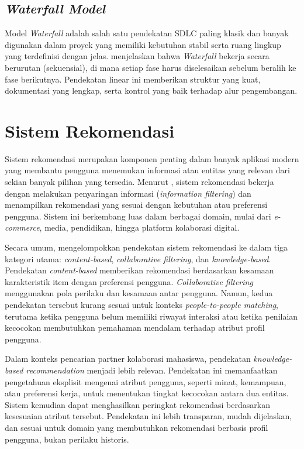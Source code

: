 \subsection{\textit{Waterfall Model}}
Model \textit{Waterfall} adalah salah satu pendekatan SDLC paling klasik dan banyak digunakan dalam proyek yang memiliki kebutuhan stabil serta ruang lingkup yang terdefinisi dengan jelas. \textcite{sommervilleSoftwareEngineering2016} menjelaskan bahwa \textit{Waterfall} bekerja secara berurutan (sekuensial), di mana setiap fase harus diselesaikan sebelum beralih ke fase berikutnya. Pendekatan linear ini memberikan struktur yang kuat, dokumentasi yang lengkap, serta kontrol yang baik terhadap alur pengembangan.

\section{Sistem Rekomendasi}
Sistem rekomendasi merupakan komponen penting dalam banyak aplikasi modern yang membantu pengguna menemukan informasi atau entitas yang relevan dari sekian banyak pilihan yang tersedia. Menurut \textcite{ricciIntroductionRecommenderSystems2011}, sistem rekomendasi bekerja dengan melakukan penyaringan informasi (\textit{information filtering}) dan menampilkan rekomendasi yang sesuai dengan kebutuhan atau preferensi pengguna. Sistem ini berkembang luas dalam berbagai domain, mulai dari \textit{e-commerce}, media, pendidikan, hingga platform kolaborasi digital.

Secara umum, \textcite{adomaviciusNextGenerationRecommender2005} mengelompokkan pendekatan sistem rekomendasi ke dalam tiga kategori utama: \textit{content-based}, \textit{collaborative filtering}, dan \textit{knowledge-based}. Pendekatan \textit{content-based} memberikan rekomendasi berdasarkan kesamaan karakteristik item dengan preferensi pengguna. \textit{Collaborative filtering} menggunakan pola perilaku dan kesamaan antar pengguna. Namun, kedua pendekatan tersebut kurang sesuai untuk konteks \textit{people-to-people matching}, terutama ketika pengguna belum memiliki riwayat interaksi atau ketika penilaian kecocokan membutuhkan pemahaman mendalam terhadap atribut profil pengguna.

Dalam konteks pencarian partner kolaborasi mahasiswa, pendekatan \textit{knowledge-based recommendation} menjadi lebih relevan. Pendekatan ini memanfaatkan pengetahuan eksplisit mengenai atribut pengguna, seperti minat, kemampuan, atau preferensi kerja, untuk menentukan tingkat kecocokan antara dua entitas. Sistem kemudian dapat menghasilkan peringkat rekomendasi berdasarkan kesesuaian atribut tersebut. Pendekatan ini lebih transparan, mudah dijelaskan, dan sesuai untuk domain yang membutuhkan rekomendasi berbasis profil pengguna, bukan perilaku historis.

